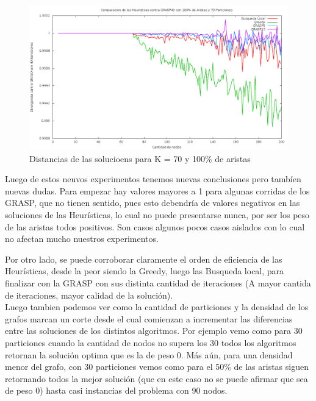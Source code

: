 \begin{figure}[H]
\begin{center}
\includegraphics[scale=0.3]{finales/muchosComparacionesCon70Particiones100Aristas.png}
\caption{Distancias de las solucioens para K = 70 y 100\% de aristas}
\end{center}
\end{figure}


Luego de estos neuvos experimentos tenemos nuevas conclusiones pero tamb\'ien nuevas dudas. Para empezar hay valores mayores a 1 para algunas corridas de los GRASP, que no tienen sentido, pues esto debendr\'ia de valores negativos en las soluciones de las Heur\'isticas, lo cual no puede presentarse nunca, por ser los peso de las aristas todos positivos. Son casos algunos pocos casos aislados con lo cual no afectan mucho nuestros experimentos.

Por otro lado, se puede corroborar claramente el orden de eficiencia de las Heur\'isticas, desde la peor siendo la Greedy, luego las Busqueda local, para finalizar con la GRASP con sus distinta cantidad de iteraciones (A mayor cantida de iteraciones, mayor calidad de la soluci\'on).\\

Luego tambien podemos ver como la cantidad de particiones y la densidad de los grafos marcan un corte desde el cual comienzan a incrementar las diferencias entre las soluciones de los distintos algoritmos. Por ejemplo vemo como para 30 particiones cuando la cantidad de nodos no supera los 30 todos los algoritmos retornan la soluci\'on optima que es la de peso 0. M\'as a\'un, para una densidad menor del grafo, con 30 particiones vemos como para el 50\% de las aristas siguen retornando todos la mejor soluci\'on (que en este caso no se puede afirmar que sea de peso 0) hasta casi instancias del problema con 90 nodos.

